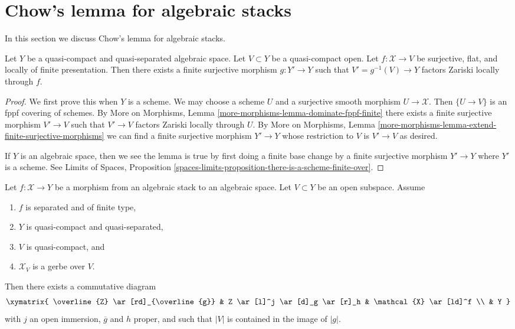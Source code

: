 \section{Chow's lemma for algebraic stacks}
\label{section-chow}

\noindent
In this section we discuss Chow's lemma for algebraic stacks.

\begin{lemma}
\label{lemma-finite-cover-factor}
Let $Y$ be a quasi-compact and quasi-separated algebraic space.
Let $V \subset Y$ be a quasi-compact open. Let $f : \mathcal{X} \to V$
be surjective, flat, and locally of finite presentation.
Then there exists a finite surjective morphism $g : Y' \to Y$ such that
$V' = g^{-1}(V) \to Y$ factors Zariski locally through $f$.
\end{lemma}

\begin{proof}
We first prove this when $Y$ is a scheme.
We may choose a scheme $U$ and a surjective smooth morphism
$U \to \mathcal{X}$. Then $\{U \to V\}$ is an fppf covering of schemes.
By More on Morphisms, Lemma \ref{more-morphisms-lemma-dominate-fppf-finite}
there exists a finite surjective morphism
$V' \to V$ such that $V' \to V$ factors Zariski locally
through $U$. By
More on Morphisms, Lemma
\ref{more-morphisms-lemma-extend-finite-surjective-morphisms}
we can find a finite surjective morphism $Y' \to Y$
whose restriction to $V$ is $V' \to V$ as desired.

\medskip\noindent
If $Y$ is an algebraic space, then we see the lemma is true by
first doing a finite base change by a finite surjective morphism
$Y' \to Y$ where $Y'$ is a scheme. See
Limits of Spaces, Proposition
\ref{spaces-limits-proposition-there-is-a-scheme-finite-over}.
\end{proof}

\begin{lemma}
\label{lemma-make-section}
Let $f : \mathcal{X} \to Y$ be a morphism from an algebraic stack
to an algebraic space. Let $V \subset Y$ be an open subspace.
Assume
\begin{enumerate}
\item $f$ is separated and of finite type,
\item $Y$ is quasi-compact and quasi-separated,
\item $V$ is quasi-compact, and
\item $\mathcal{X}_V$ is a gerbe over $V$.
\end{enumerate}
Then there exists a commutative diagram
$$
\xymatrix{
\overline{Z} \ar[rd]_{\overline{g}} &
Z \ar[l]^j \ar[d]_g \ar[r]_h & \mathcal{X} \ar[ld]^f \\
& Y
}
$$
with $j$ an open immersion, $\overline{g}$ and $h$ proper,
and such that $|V|$ is contained in the image of $|g|$.
\end{lemma}

